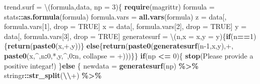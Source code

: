\documentclass[
]{article}
\newenvironment{Shaded}{\begin{snugshade}}{\end{snugshade}}
\newcommand{\AttributeTok}[1]{\textcolor[rgb]{0.13,0.29,0.53}{#1}}
\newcommand{\ConstantTok}[1]{\textcolor[rgb]{0.56,0.35,0.01}{#1}}
\newcommand{\ControlFlowTok}[1]{\textcolor[rgb]{0.13,0.29,0.53}{\textbf{#1}}}
\newcommand{\DecValTok}[1]{\textcolor[rgb]{0.00,0.00,0.81}{#1}}
\newcommand{\FunctionTok}[1]{\textcolor[rgb]{0.13,0.29,0.53}{\textbf{#1}}}
\newcommand{\NormalTok}[1]{#1}
\newcommand{\OtherTok}[1]{\textcolor[rgb]{0.56,0.35,0.01}{#1}}
\newcommand{\SpecialCharTok}[1]{\textcolor[rgb]{0.81,0.36,0.00}{\textbf{#1}}}
\newcommand{\StringTok}[1]{\textcolor[rgb]{0.31,0.60,0.02}{#1}}
\begin{document}
\begin{Shaded}
\begin{Highlighting}[]
\NormalTok{trend.surf }\OtherTok{=}\NormalTok{ \textbackslash{}(formula,data, }\AttributeTok{np =} \DecValTok{3}\NormalTok{)\{}
  \FunctionTok{require}\NormalTok{(magrittr)}
\NormalTok{  formula }\OtherTok{=}\NormalTok{ stats}\SpecialCharTok{::}\FunctionTok{as.formula}\NormalTok{(formula)}
\NormalTok{  formula.vars }\OtherTok{=} \FunctionTok{all.vars}\NormalTok{(formula)}
\NormalTok{  z }\OtherTok{=}\NormalTok{ data[, formula.vars[}\DecValTok{1}\NormalTok{], drop }\OtherTok{=} \ConstantTok{TRUE}\NormalTok{]}
\NormalTok{  x }\OtherTok{=}\NormalTok{ data[, formula.vars[}\DecValTok{2}\NormalTok{], drop }\OtherTok{=} \ConstantTok{TRUE}\NormalTok{]}
\NormalTok{  y }\OtherTok{=}\NormalTok{ data[, formula.vars[}\DecValTok{3}\NormalTok{], drop }\OtherTok{=} \ConstantTok{TRUE}\NormalTok{]}
\NormalTok{  generatesurf }\OtherTok{=}\NormalTok{ \textbackslash{}(n,}\AttributeTok{x =} \StringTok{\textquotesingle{}x\textquotesingle{}}\NormalTok{,}\AttributeTok{y =} \StringTok{\textquotesingle{}y\textquotesingle{}}\NormalTok{)\{}\ControlFlowTok{if}\NormalTok{(n}\SpecialCharTok{==}\DecValTok{1}\NormalTok{)\{}\FunctionTok{return}\NormalTok{(}\FunctionTok{paste0}\NormalTok{(x,}\StringTok{\textquotesingle{}+\textquotesingle{}}\NormalTok{,y))\}}
                      \ControlFlowTok{else}\NormalTok{\{}\FunctionTok{return}\NormalTok{(}\FunctionTok{paste0}\NormalTok{(}\FunctionTok{generatesurf}\NormalTok{(n}\DecValTok{{-}1}\NormalTok{,x,y),}\StringTok{\textquotesingle{}+\textquotesingle{}}\NormalTok{,}
                                  \FunctionTok{paste0}\NormalTok{(x,}\StringTok{\textquotesingle{}\^{}\textquotesingle{}}\NormalTok{,n}\SpecialCharTok{:}\DecValTok{0}\NormalTok{,}\StringTok{\textquotesingle{}*\textquotesingle{}}\NormalTok{,y,}\StringTok{\textquotesingle{}\^{}\textquotesingle{}}\NormalTok{,}\DecValTok{0}\SpecialCharTok{:}\NormalTok{n,}
                                         \AttributeTok{collapse =} \StringTok{\textquotesingle{}+\textquotesingle{}}\NormalTok{)))\}\}}
  \ControlFlowTok{if}\NormalTok{(np }\SpecialCharTok{\textless{}=} \DecValTok{0}\NormalTok{)\{}
    \FunctionTok{stop}\NormalTok{(}\StringTok{\textquotesingle{}Please provide a positive integar!\textquotesingle{}}\NormalTok{)}
\NormalTok{    \}}\ControlFlowTok{else}\NormalTok{ \{}
\NormalTok{    newdata }\OtherTok{=} \FunctionTok{generatesurf}\NormalTok{(np) }\SpecialCharTok{\%\textgreater{}\%} 
\NormalTok{    stringr}\SpecialCharTok{::}\FunctionTok{str\_split}\NormalTok{(}\StringTok{\textquotesingle{}}\SpecialCharTok{\textbackslash{}\textbackslash{}}\StringTok{+\textquotesingle{}}\NormalTok{) }\SpecialCharTok{\%\textgreater{}\%} 

\end{Highlighting}
\end{Shaded}
\end{document}
